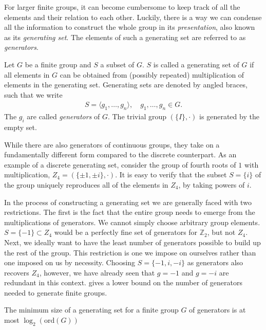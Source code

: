 For larger finite groups, it can become cumbersome to keep track of all the
elements and their relation to each other. Luckily, there is a way we can
condense all the information to construct the whole group in its
\emph{presentation}, also known as its \emph{generating set}. The elements of
such a generating set are referred to as \emph{generators}.
\begin{defn}\label{defn:generators}
  Let $G$ be a finite group and $S$ a subset of $G$. $S$ is called a generating
  set of $G$ if all elements in $G$ can be obtained from (possibly repeated)
  multiplication of elements in the generating set. Generating sets are denoted
  by angled braces, such that we write
  \begin{align}
    S = \langle g_1, \ldots, g_n \rangle, \quad g_1,\ldots, g_n \in G
  .\end{align}
  The $g_i$ are called \emph{generators} of $G$. The trivial group $\left(
  \{I\}, \cdot \right)$ is generated by the empty set.
\end{defn}

While there are also generators of continuous groups, they take on a
fundamentally different form compared to the discrete counterpart. As an
example of a discrete generating set, consider the group of fourth roots of $1$
with multiplication, $Z_4 = \left( \{\pm 1,\pm i\}, \cdot \right)$. It is easy
to verify that the subset $S = \{i\}$ of the group uniquely reproduces all of
the elements in $Z_4$, by taking powers of $i$.

In the process of constructing a generating set we are generally faced with two
restrictions. The first is the fact that the entire group needs to emerge from
the multiplications of generators. We cannot simply choose arbitrary group
elements. $S=\{-1\}\subset Z_4$ would be a perfectly fine set of generators for
$\mathbb{Z}_2$, but not $Z_4$. Next, we ideally want to have the least number
of generators possible to build up the rest of the group. This restriction is
one we impose on ourselves rather than one imposed on us by necessity. Choosing
$S=\{-1, i, -i\}$ as generators also recovers $Z_4$, however, we have already
seen that $g=-1$ and $g=-i$ are redundant in this context.
 gives a lower bound on the number of generators
needed to generate finite groups.

\begin{thm}\label{thm:maxsize-generators} 
  The minimum size of a generating set for a finite group $G$ of generators is
  at most $\log_2(\mathrm{ord}(G))$
\end{thm}

